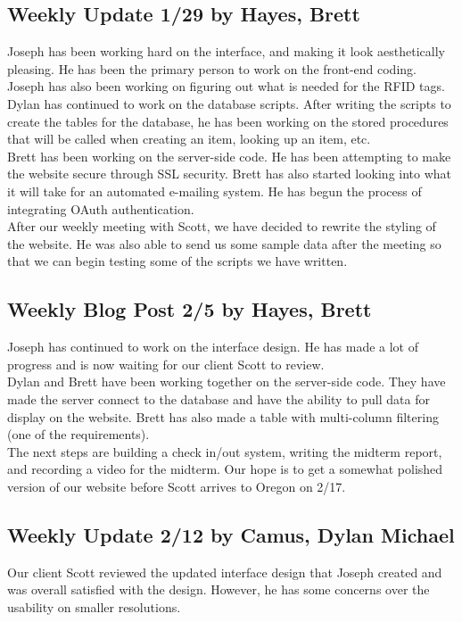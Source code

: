\documentclass[10pt, onecolumn, twoside, peerreview]{IEEEtran}
\begin{document}
\subsection{Weekly Update 1/29 by Hayes, Brett}
Joseph has been working hard on the interface, and making it look aesthetically pleasing. He has been the primary person to work on the front-end coding. Joseph has also been working on figuring out what is needed for the RFID tags.\\

Dylan has continued to work on the database scripts. After writing the scripts to create the tables for the database, he has been working on the stored procedures that will be called when creating an item, looking up an item, etc.\\

​Brett has been working on the server-side code. He has been attempting to make the website secure through SSL security. Brett has also started looking into what it will take for an automated e-mailing system. He has begun the process of integrating OAuth authentication.\\

After our weekly meeting with Scott, we have decided to rewrite the styling of the website. He was also able to send us some sample data after the meeting so that we can begin testing some of the scripts we have written.

\subsection{Weekly Blog Post 2/5 by Hayes, Brett}
Joseph has continued to work on the interface design. He has made a lot of progress and is now waiting for our client Scott to review.\\

Dylan and Brett have been working together on the server-side code. They have made the server connect to the database and have the ability to pull data for display on the website. Brett has also made a table with multi-column filtering (one of the requirements).​\\

The next steps are building a check in/out system, writing the midterm report, and recording a video for the midterm. Our hope is to get a somewhat polished version of our website before Scott arrives to Oregon on 2/17.

\subsection{Weekly Update 2/12 by Camus, Dylan Michael}
Our client Scott reviewed the updated interface design that Joseph created and was overall satisfied with the design. However, he has some concerns over the usability on smaller resolutions.\\
\end{document}
